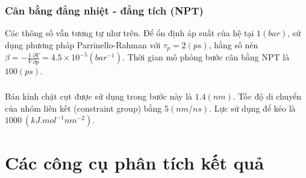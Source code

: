 \documentclass[12pt,a4paper,reqno, oneside]{book}
\begin{document}
\subsubsection{Cân bằng đẳng nhiệt - đẳng tích (NPT)}
Các thông số vẫn tương tự như trên. Để ổn định áp suất của hệ tại $1 \left(bar\right)$, sử dụng phương pháp Parrinello-Rahman với $\tau_{p}=2\left(ps\right)$, hằng số nén $\beta=-\frac{1}{V}\frac{\partial V}{\partial p} = 4.5\times 10^{-5}\left(bar^{-1}\right)$. Thời gian mô phỏng bước cân bằng NPT là $100\left(ps\right)$.
\subsubsection{}
Bán kính chặt cụt được sử dụng trong bước này là $1.4\left(nm\right)$. Tốc độ di chuyển của nhóm liên kết (constraint group) bằng $5\left(nm/ns\right)$. Lực sử dụng để kéo là $1000\ \left( kJ . mol^ {-1} nm^ {-2} \right)$.
\section{Các công cụ phân tích kết quả}
\end{document}
